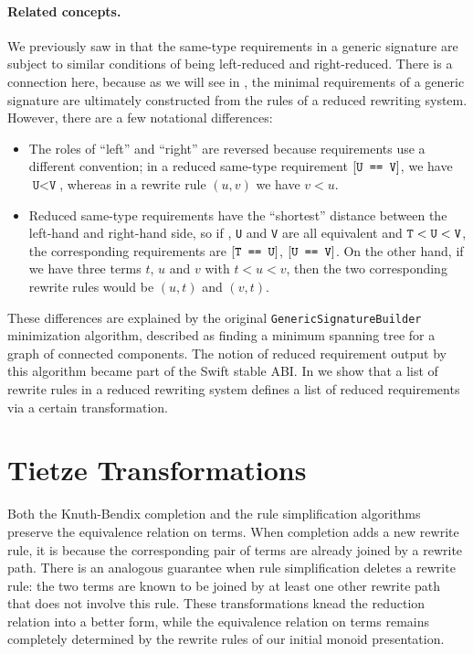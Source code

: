\documentclass[../generics]{subfiles}
\begin{document}
\paragraph{Related concepts.}
We previously saw in  that the same-type requirements in a generic signature are subject to similar conditions of being left-reduced and right-reduced. There is a connection here, because as we will see in , the minimal requirements of a generic signature are ultimately constructed from the rules of a reduced rewriting system. However, there are a few notational differences:
\begin{itemize}
\item The roles of ``left'' and ``right'' are reversed because requirements use a different convention; in a reduced same-type requirement $[\texttt{U == V}]$, we have $\texttt{U} < \texttt{V}$, whereas in a rewrite rule $(u, v)$ we have $v<u$.
\item Reduced same-type requirements have the ``shortest'' distance between the left-hand and right-hand side, so if \tT, \texttt{U} and \texttt{V} are all equivalent and $\texttt{T}<\texttt{U}<\texttt{V}$, the corresponding requirements are $[\texttt{T == U}]$, $[\texttt{U == V}]$. On the other hand, if we have three terms $t$, $u$ and $v$ with $t<u<v$, then the two corresponding rewrite rules would be $(u, t)$ and $(v, t)$.
\end{itemize}
These differences are explained by the original \texttt{GenericSignatureBuilder} minimization algorithm, described as finding a minimum spanning tree for a graph of connected components. The notion of reduced requirement output by this algorithm became part of the Swift stable ABI. In  we show that a list of rewrite rules in a reduced rewriting system defines a list of reduced requirements via a certain transformation.

\section{Tietze Transformations}\label{tietze transformations}

Both the Knuth-Bendix completion and the rule simplification algorithms preserve the equivalence relation on terms. When completion adds a new rewrite rule, it is because the corresponding pair of terms are already joined by a rewrite path. There is an analogous guarantee when rule simplification deletes a rewrite rule: the two terms are known to be joined by at least one other rewrite path that does not involve this rule. These transformations knead the reduction relation into a better form, while the equivalence relation on terms remains completely determined by the rewrite rules of our initial monoid presentation.
\end{document}
